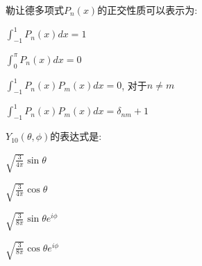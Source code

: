 \documentclass{njustexam}
\begin{document}
\begin{problem}
  勒让德多项式$P_n(x)$的正交性质可以表示为:
  \begin{abcd}
    \item $\int_{-1}^{1} P_n(x) dx = 1$
    \item $\int_{0}^{\pi} P_n(x) dx = 0$
    \item $\int_{-1}^{1} P_n(x) P_m(x) dx = 0$, 对于$n \neq m$
    \item $\int_{-1}^{1} P_n(x) P_m(x) dx = \delta_{nm} + 1$
  \end{abcd}
\end{problem}

\begin{problem}
  $Y_{10}(\theta,  \phi)$的表达式是:
\begin{abcd}
  \item $\sqrt{\frac{3}{4\pi}} \sin \theta$
  \item $\sqrt{\frac{3}{4\pi}} \cos \theta$
  \item $\sqrt{\frac{3}{8\pi}} \sin \theta e^{i\phi}$
  \item $\sqrt{\frac{3}{8\pi}} \cos \theta e^{i\phi}$
\end{abcd}
\end{problem}





\end{document}
